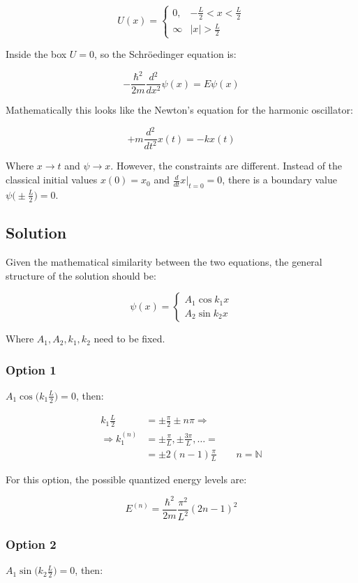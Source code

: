 $$U(x) = \begin{cases} 0, &-\frac{L}{2}<x<\frac{L}{2}\\\infty &|x|>\frac{L}{2}\end{cases}$$

Inside the box $U=0$, so the Schr\"oedinger equation is:

$$-\frac{\hbar^2}{2m}\frac{d{^2}}{d{x^2}}\psi(x) = E\psi(x)$$

Mathematically this looks like the Newton's equation for the harmonic oscillator:

$$+m \frac{d{^2}}{d{t^2}}x(t) = -kx(t)$$

Where $x\rightarrow t$ and $\psi\rightarrow x$.
However, the constraints are different. Instead of the classical initial values $x(0) = x_0$ and $\frac{d{}}{d{t}}x|_{t=0} = 0$, there is a boundary value $\psi\bigl(\pm \frac{L}{2}\bigr) = 0$.

  \subsection{Solution}
  Given the mathematical similarity between the two equations, the general structure of the solution should be:

  $$\psi(x) = \begin{cases}A_1\cos k_1 x \\A_2\sin k_2x\end{cases}$$

  Where $A_1,A_2,k_1, k_2$ need to be fixed.

    \subsubsection{Option 1}
    $A_1\cos\biggl(k_1 \frac{L}{2}\biggr) = 0$, then:

    \begin{align*}
      k_1 \frac{L}{2} &=\pm \frac{\pi}{2}\pm n\pi\Rightarrow\\
      \Rightarrow k_1^{(n)} &=\pm \frac{\pi}{L},\pm \frac{3\pi}{L},\dots =\\
                            &= \pm 2(n-1)\frac{\pi}{L}\qquad n = \mathbb{N}
    \end{align*}

    For this option, the possible quantized energy levels are:

    $$E^{(n)} = \frac{\hbar^2}{2m}\frac{\pi^2}{L^2}(2n-1)^2$$

    \subsubsection{Option 2}
    $A_1\sin\biggl(k_2 \frac{L}{2}\biggr) = 0$, then:

